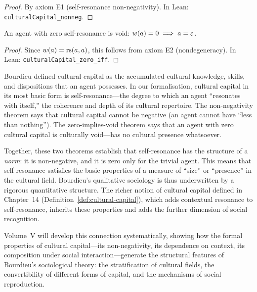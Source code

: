 \begin{proof}
By axiom E1 (self-resonance non-negativity).  In Lean: \texttt{culturalCapital\_nonneg}.
\end{proof}

\begin{theorem}
\label{thm:cultural-capital-zero}
An agent with zero self-resonance is void: $w(a) = 0 \implies a = \varepsilon$.
\end{theorem}

\begin{proof}
Since $w(a) = \mathrm{rs}(a, a)$, this follows from axiom E2 (nondegeneracy).  In Lean: \texttt{culturalCapital\_zero\_iff}.
\end{proof}

\begin{interpretation}
\label{interp:bourdieu-capital-formal}
Bourdieu defined cultural capital as the accumulated cultural knowledge, skills, and dispositions that an agent possesses.  In our formalisation, cultural capital in its most basic form is self-resonance---the degree to which an agent ``resonates with itself,'' the coherence and depth of its cultural repertoire.  The non-negativity theorem says that cultural capital cannot be negative (an agent cannot have ``less than nothing'').  The zero-implies-void theorem says that an agent with zero cultural capital is culturally void---has no cultural presence whatsoever.

Together, these two theorems establish that self-resonance has the structure of a \emph{norm}: it is non-negative, and it is zero only for the trivial agent.  This means that self-resonance satisfies the basic properties of a measure of ``size'' or ``presence'' in the cultural field.  Bourdieu's qualitative sociology is thus underwritten by a rigorous quantitative structure.  The richer notion of cultural capital defined in Chapter~14 (Definition~\ref{def:cultural-capital}), which adds contextual resonance to self-resonance, inherits these properties and adds the further dimension of social recognition.

Volume~V will develop this connection systematically, showing how the formal properties of cultural capital---its non-negativity, its dependence on context, its composition under social interaction---generate the structural features of Bourdieu's sociological theory: the stratification of cultural fields, the convertibility of different forms of capital, and the mechanisms of social reproduction.
\end{interpretation}

